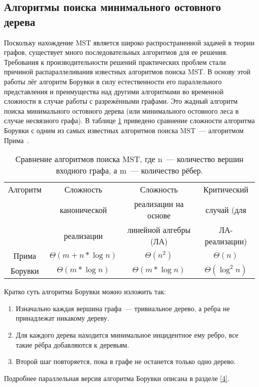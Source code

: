 \documentclass[14pt]{matmex-diploma-custom}
\begin{document}
\subsection{Алгоритмы поиска минимального остовного дерева}
Поскольку нахождение MST является широко распространенной задачей в теории графов, существует много последовательных алгоритмов для ее решения. Требования к производительности решений практических проблем стали причиной распараллеливания известных алгоритмов поиска MST. В основу этой работы лёг алгоритм Борувки в силу естественности его параллельного представления и преимущества над другими алгоритмами во временной сложности в случае работы с разрежёнными графами. Это жадный алгоритм поиска минимального остовного дерева (или минимального остовного леса в случае несвязного графа). В таблице \ref{5} приведено сравнение сложности алгоритма Борувки с одним из самых известных алгоритмов поиска MST~--- алгоритмом Прима~\cite{PrimVSBoruvka}.
\begin{table}[ht]
\caption{Сравнение алгоритмов поиска MST, где n~--- количество вершин входного графа, а m~--- количество рёбер.}\label{5}
\centering
	\begin{tabular}{|c|c|c|c|}\hline
		Алгоритм & Сложность & Сложность & Критический \\
                & канонической & реализации на основе & случай (для\\
                & реализации & линейной алгебры (ЛА) & ЛА-реализации)\\\hline
		Прима & $\Theta(m+n*\log n)$ & $\Theta(n^2)$ & $\Theta(n)$ \\\hline
		Борувки & $\Theta(m*\log n)$ & $\Theta(m*\log n)$ & $\Theta(\log^2 n)$ \\\hline
	\end{tabular}
\end{table}

Кратко суть алгоритма Борувки можно изложить так:
\begin{enumerate}
\item Изначально каждая вершина графа~--- тривиальное дерево, а ребра не принадлежат никакому дереву.
\item Для каждого дерева находится минимальное инцидентное ему ребро, все такие рёбра добавляются к деревьям.
\item Второй шаг повторяется, пока в графе не останется только одно дерево. 
\end{enumerate}
Подробнее параллельная версия алгоритма Борувки описана в разделе \ref{4}.
\end{document}

